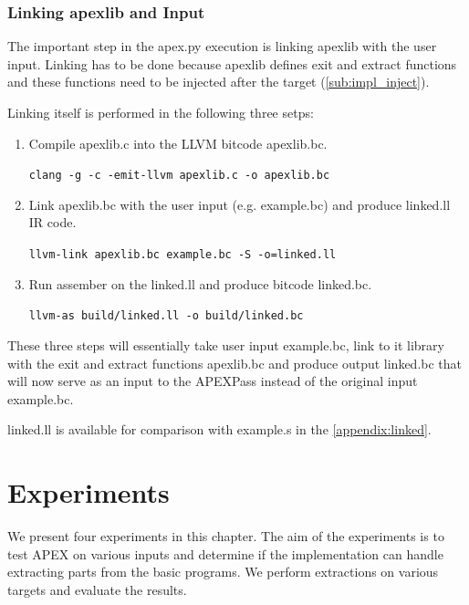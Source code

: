 \documentclass[12pt, twoside]{fithesis2}
\renewcommand{\_}{\leavevmode \kern0.07em\vbox{\hrule width0.4em}}
\newenvironment{myEnumerate}{
  \begin{enumerate}[
    leftmargin=2em,
    rightmargin=1em,
    itemsep=\parskip,
    parsep=0em,
    topsep=0em,
    partopsep=0em
]
}{
  \end{enumerate}
}
\begin{document}
\subsection{Linking apexlib and Input}

The important step in the apex.py execution is linking apexlib with the user
input. Linking has to be done because apexlib defines exit and extract
functions and these functions need to be injected after the target
(\autoref{sub:impl_inject}).

Linking itself is performed in the following three setps:
\begin{myEnumerate}
\item Compile apexlib.c into the LLVM bitcode apexlib.bc.

\texttt{clang -g -c -emit-llvm apexlib.c -o apexlib.bc}

\item Link apexlib.bc with the user input (e.g. example.bc) and produce linked.ll
IR code.

\texttt{llvm-link apexlib.bc example.bc -S -o=linked.ll}

\item Run assember on the linked.ll and produce bitcode linked.bc.

\texttt{llvm-as build/linked.ll -o build/linked.bc}

\end{myEnumerate}

These three steps will essentially take user input example.bc, link to it
library with the exit and extract functions apexlib.bc and produce output
linked.bc that will now serve as an input to the APEXPass instead of the original
input example.bc.

linked.ll is available for comparison with example.s in the
\autoref{appendix:linked}.

\chapter{Experiments}
\label{chap:experiments}

We present four experiments in this chapter. The aim of the experiments is to
test APEX on various inputs and determine if the implementation can handle
extracting parts from the basic programs. We perform extractions on various
targets and evaluate the results.
\end{document}
